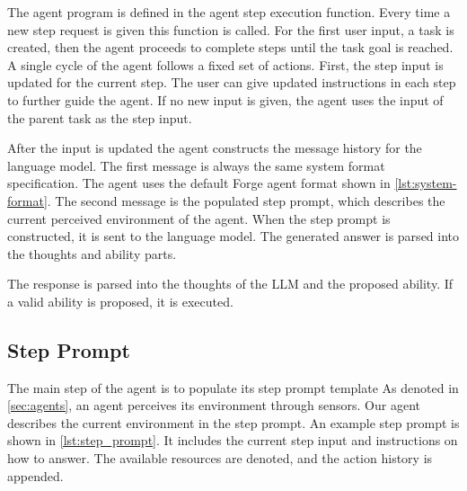 \documentclass[../main.tex]{subfiles}
\begin{document}
The agent program is defined in the agent step execution function.
Every time a new step request is given this function is called.
For the first user input, a task is created,
then the agent proceeds to complete steps until the task goal is reached.
A single cycle of the agent follows a fixed set of actions.
First, the step input is updated for the current step.
The user can give updated instructions in each step to further guide the agent.
If no new input is given, the agent uses the input of the parent task as the step input.

After the input is updated the agent constructs the message history for the language model.
The first message is always the same system format specification.
The agent uses the default Forge agent format shown in \autoref{lst:system-format}.
The second message is the populated step prompt, which describes the current perceived environment of the agent.
When the step prompt is constructed, it is sent to the language model.
The generated answer is parsed into the thoughts and ability parts.

The response is parsed into the thoughts of the LLM and the proposed ability.
If a valid ability is proposed, it is executed.

\subsection{Step Prompt}



The main step of the agent is to populate its step prompt template
As denoted in \autoref{sec:agents}, an agent perceives its environment through sensors.
Our agent describes the current environment in the step prompt.
An example step prompt is shown in \autoref{lst:step_prompt}.
It includes the current step input and instructions on how to answer.
The available resources are denoted, and the action history is appended.
\end{document}
